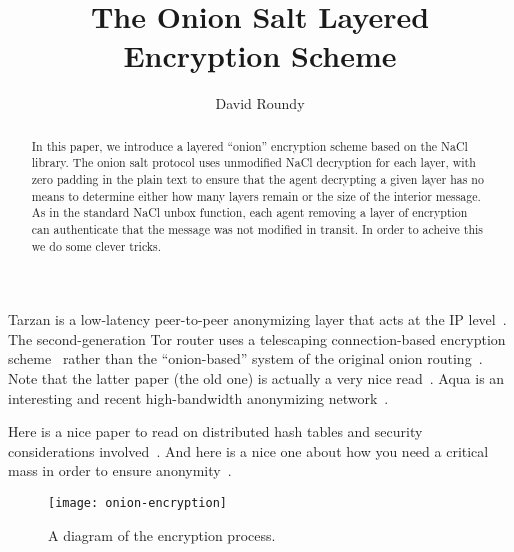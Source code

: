 \documentclass[letterpaper,twocolumn,amsmath,amssymb,pre,aps,10pt]{revtex4-1}
\begin{document}
\title{The Onion Salt Layered Encryption Scheme}
\author{David Roundy}

\begin{abstract}
  In this paper, we introduce a layered ``onion'' encryption scheme
  based on the NaCl library.  The onion salt protocol uses unmodified
  NaCl decryption for each layer, with zero padding in the plain text
  to ensure that the agent decrypting a given layer has no means to
  determine either how many layers remain or the size of the interior
  message.  As in the standard NaCl unbox function, each agent
  removing a layer of encryption can authenticate that the message was
  not modified in transit.  In order to acheive this we do some clever
  tricks.
\end{abstract}

\maketitle

Tarzan is a low-latency peer-to-peer anonymizing layer that acts at
the IP level~\cite{freedman2002tarzan}.  The second-generation Tor
router uses a telescaping connection-based encryption
scheme~\cite{dingledine2004tor} rather than the ``onion-based'' system
of the original onion routing~\cite{reed1998onionrouting}.  Note that
the latter paper (the old one) is actually a very nice
read~\cite{reed1998onionrouting}.  Aqua is an interesting and recent
high-bandwidth anonymizing network~\cite{leblond2013towards}.

Here is a nice paper to read on distributed hash tables and security
considerations involved~\cite{sit2002security}.  And here is a nice
one about how you need a critical mass in order to ensure
anonymity~\cite{dingledine2006anonymity}.

\begin{figure*}
  \begin{center}
    \texttt{[image: onion-encryption]}
  \end{center}
  \caption{A diagram of the encryption process.}
\end{figure*}

\end{document}
